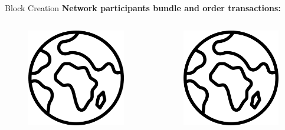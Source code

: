 \documentclass[]{beamer}
\begin{document}
\begin{frame}{Block Creation}
	\textbf{Network participants bundle and order transactions:}
	\begin{columns}
		\begin{column}{0.45\textwidth}	
			\begin{figure}
				\includegraphics[width = \textwidth]{../assets/images/globe.png}
			\end{figure}
		\end{column}
		\begin{column}{0.45\textwidth}	
			\begin{figure}
				\includegraphics[width = \textwidth]{../assets/images/globe.png}
			\end{figure}
		\end{column}
	\end{columns}
\end{frame}
\end{document}
